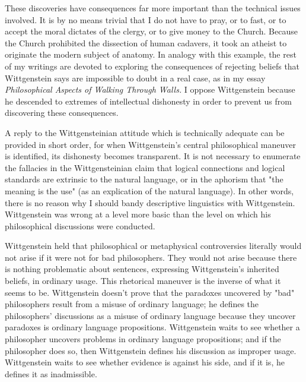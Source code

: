 \documentclass[10pt,twoside,draft]{memoir}
\newcommand{\essaytitle}[1]{
	\emph{#1}}
\begin{document}
These discoveries have consequences far more important than the 
technical issues involved. It is by no means trivial that I do not have to pray, 
or to fast, or to accept the moral dictates of the clergy, or to give money to 
the Church. Because the Church prohibited the dissection of human 
cadavers, it took an atheist to originate the modern subject of anatomy. In 
analogy with this example, the rest of my writings are devoted to exploring 
the consequences of rejecting beliefs that Wittgenstein says are impossible to 
doubt in a real case, as in my essay \essaytitle{Philosophical Aspects of Walking 
Through Walls.} I oppose Wittgenstein because he descended to extremes of 
intellectual dishonesty in order to prevent us from discovering these 
consequences. 

A reply to the Wittgensteinian attitude which is technically adequate 
can be provided in short order, for when Wittgenstein's central philosophical 
maneuver is identified, its dishonesty becomes transparent. It is not 
necessary to enumerate the fallacies in the Wittgensteinian claim that logical 
connections and logical standards are extrinsic to the natural language, or in 
the aphorism that "the meaning is the use" (as an explication of the natural 
language). In other words, there is no reason why I should bandy descriptive 
linguistics with Wittgenstein. Wittgenstein was wrong at a level more basic 
than the level on which his philosophical discussions were conducted. 

Wittgenstein held that philosophical or metaphysical controversies 
literally would not arise if it were not for bad philosophers. They would not 
arise because there is nothing problematic about sentences, expressing 
Wittgenstein's inherited beliefs, in ordinary usage. This rhetorical maneuver 
is the inverse of what it seems to be. Wittgenstein doesn't prove that the 
paradoxes uncovered by "bad" philosophers result from a misuse of ordinary 
language; he defines the philosophers' discussions as a misuse of ordinary 
language because they uncover paradoxes is ordinary language propositions. 
Wittgenstein waits to see whether a philosopher uncovers problems in 
ordinary language propositions; and if the philosopher does so, then 
Wittgenstein defines his discussion as improper usage. Wittgenstein waits to 
see whether evidence is against his side, and if it is, he defines it as 
inadmissible. 
\end{document}
